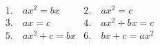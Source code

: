 \documentclass[preview]{standalone}
\begin{document}
\begin{align*}
&1.&\ ax^2 = bx    &2.&\ ax^2 = c \\ &3.&\ ax = c    &4.&\ ax^2+bx = c \\ &5.&\ ax^2+c = bx  &6.&\ bx+c = ax^2
\end{align*}
\end{document}
